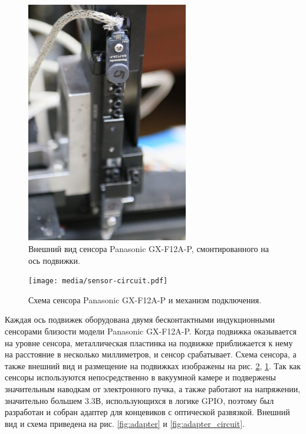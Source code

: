 \documentclass[14pt,russian,a4paper]{extarticle}
\begin{document}
\begin{figure}[h!]
    \centerline{\includegraphics[width=200pt]{media/sensor_mounted.jpg}}
    \caption{Внешний вид сенсора Panasonic GX-F12A-P, смонтированного на ось подвижки.}
    \label{fig:sensor_mounted}
\end{figure}

\begin{figure}[h!]
    \centerline{\texttt{[image: media/sensor-circuit.pdf]}}
    \caption{Схема сенсора Panasonic GX-F12A-P и механизм подключения.}
    \label{fig:sensor_circuit}
\end{figure}

Каждая ось подвижек оборудована двумя бесконтактными индукционными сенсорами близости модели Panasonic GX-F12A-P. Когда подвижка оказывается на уровне сенсора, металлическая пластинка на подвижке приближается к нему на расстояние в несколько миллиметров, и сенсор срабатывает. Схема сенсора, а также внешний вид и размещение на подвижках изображены на рис. \ref{fig:sensor_circuit}, \ref{fig:sensor_mounted}. 
\newline
Так как сенсоры используются непосредственно в вакуумной камере и подвержены значительным наводкам от электронного пучка, а также работают на напряжении, значительно большем 3.3В, использующихся в логике GPIO, поэтому был разработан и собран адаптер для концевиков с оптической развязкой. Внешний вид и схема приведена на рис. \ref{fig:adapter} и \ref{fig:adapter_circuit}.
\newline
\end{document}
